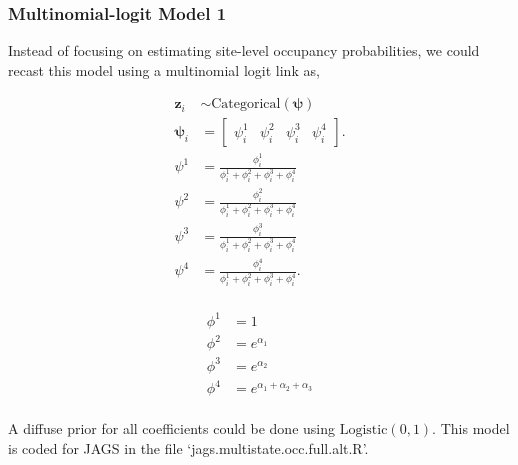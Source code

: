 \documentclass[12pt]{article}
\begin{document}
\subsubsection{Multinomial-logit Model 1}
Instead of focusing on estimating site-level occupancy probabilities, we could recast this model using a multinomial logit link as, 
\begin{center}
\begin{align*}
\textbf{z}_{i} &\sim \text{Categorical}(\boldsymbol{\psi})\\
\boldsymbol{\psi}_{i} &= \begin{bmatrix} \psi^1_{i} & \psi^2_{i} & \psi^3_{i} & \psi^4_{i} \end{bmatrix}.\\
\psi^1 &=\frac{\phi^1_{i}}{\phi^1_{i}+ \phi^2_{i}+\phi^3_{i}+\phi^4_{i}}\\
\psi^2 &=\frac{\phi^2_{i}}{\phi^1_{i}+ \phi^2_{i}+\phi^3_{i}+\phi^4_{i}}\\
\psi^3 &=\frac{\phi^3_{i}}{\phi^1_{i}+ \phi^2_{i}+\phi^3_{i}+\phi^4_{i}}\\
\psi^4 &=\frac{\phi^4_{i}}{\phi^1_{i}+ \phi^2_{i}+\phi^3_{i}+\phi^4_{i}}.\\
\end{align*}
\end{center}

\begin{center}
\begin{align*}
\phi^1 &= 1\\
\phi^2 &= e^{\alpha_{1}}\\
\phi^3 &= e^{\alpha_{2}}\\
\phi^4 &= e^{\alpha_{1}+\alpha_{2}+\alpha_{3}}\\
\end{align*}
\end{center}

A diffuse prior for all coefficients could be done using $\text{Logistic}(0,1).$ This model is coded for JAGS in the file `jags.multistate.occ.full.alt.R'.
\end{document}
